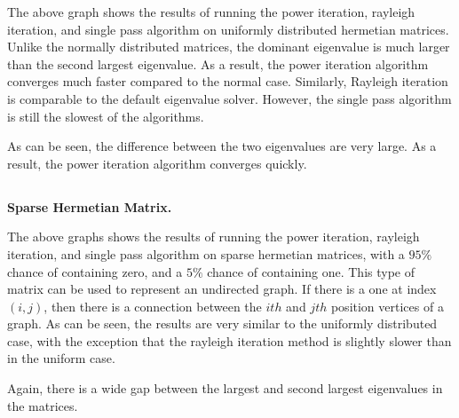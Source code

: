 \documentclass[11pt]{amsart}
\begin{document}
\begin{center}
\end{center}

The above graph shows the results of running the power iteration, rayleigh iteration, and single pass algorithm on uniformly distributed hermetian matrices. Unlike the normally distributed matrices, the dominant eigenvalue is much larger than the second largest eigenvalue. As a result, the power iteration algorithm converges much faster compared to the normal case. Similarly, Rayleigh iteration is comparable to the default eigenvalue solver. However, the single pass algorithm is still the slowest of the algorithms.

\begin{center}
\end{center}

As can be seen, the difference between the two eigenvalues are very large. As a result, the power iteration algorithm converges quickly.

\subsection{} \textbf{Sparse Hermetian Matrix.}

\begin{center}
\end{center}

The above graphs shows the results of running the power iteration, rayleigh iteration, and single pass algorithm on sparse hermetian matrices, with a $95\%$ chance of containing zero, and a $5\%$ chance of containing one. This type of matrix can be used to represent an undirected graph. If there is a one at index $(i,j)$, then there is a connection between the $ith$ and $jth$ position vertices of a graph. As can be seen, the results are very similar to the uniformly distributed case, with the exception that the rayleigh iteration method is slightly slower than in the uniform case.

\begin{center}
\end{center}

Again, there is a wide gap between the largest and second largest eigenvalues in the matrices.
\end{document}
